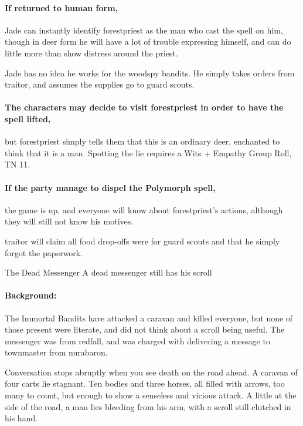 \begin{multicols}{2}
\paragraph{If returned to human form,}
Jade can instantly identify \gls{forestpriest} as the man who cast the spell on him, though in deer form he will have a lot of trouble expressing himself, and can do little more than show distress around the priest.

Jade has no idea he works for the woodspy bandits.
He simply takes orders from \gls{traitor}, and assumes the supplies go to \gls{guard} scouts.

\paragraph{The characters may decide to visit \gls{forestpriest} in order to have the spell lifted,}
but \gls{forestpriest} simply tells them that this is an ordinary deer, enchanted to think that it is a man.
Spotting the lie requires a Wits + Empathy Group Roll, TN 11.

\paragraph{If the party manage to dispel the Polymorph spell,}
the game is up, and everyone will know about \gls{forestpriest}'s actions, although they will still not know his motives.

\Gls{traitor} will claim all food drop-offs were for \gls{guard} scouts and that he simply forgot the paperwork.

{The Dead Messenger}%
{A dead messenger still has his scroll}%

\paragraph{Background:}
The Immortal Bandits have attacked a caravan and killed everyone, but none of those present were literate, and did not think about a scroll being useful.
The messenger was from \gls{redfall}, and was charged with delivering a message to \gls{townmaster} from \gls{nurabaron}.

\begin{boxtext}

  Conversation stops abruptly when you see death on the road ahead.
  A caravan of four carts lie stagnant.
  Ten bodies and three horses, all filled with arrows, too many to count, but enough to show a senseless and vicious attack.
  A little at the side of the road, a man lies bleeding from his arm, with a scroll still clutched in his hand.


\end{boxtext}
\end{multicols}
